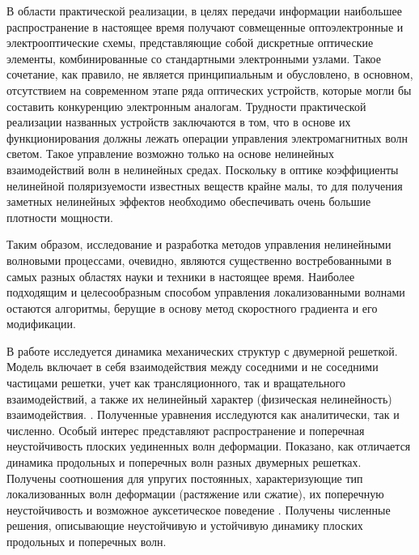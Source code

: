 В области практической реализации, в целях передачи информации наибольшее распространение в настоящее время получают совмещенные оптоэлектронные и электрооптические схемы, представляющие собой дискретные оптические элементы, комбинированные со стандартными электронными узлами. Такое сочетание, как правило, не является принципиальным и обусловлено, в основном, отсутствием на современном этапе ряда оптических устройств, которые могли бы составить конкуренцию электронным аналогам. Трудности практической реализации названных устройств заключаются в том, что в основе их функционирования должны лежать операции управления электромагнитных волн светом. Такое управление возможно только на основе нелинейных взаимодействий волн в нелинейных средах. Поскольку в оптике коэффициенты нелинейной поляризуемости известных веществ крайне малы, то для получения заметных нелинейных эффектов необходимо обеспечивать очень большие плотности мощности.

Таким образом, исследование и разработка методов управления нелинейными волновыми процессами, очевидно, являются существенно востребованными в самых разных областях науки и техники в настоящее время. Наиболее подходящим и целесообразным способом управления локализованными волнами остаются алгоритмы, берущие в основу метод скоростного градиента и его модификации. 



В работе исследуется динамика механических структур с двумерной решеткой. Модель включает в себя взаимодействия между соседними и не соседними частицами решетки, учет как трансляционного, так и вращательного взаимодействий, а также их нелинейный характер (физическая нелинейность) взаимодействия. . Полученные уравнения исследуются как аналитически, так и численно. Особый интерес представляют распространение и поперечная неустойчивость плоских уединенных волн деформации. Показано, как отличается динамика продольных и поперечных волн разных двумерных решетках. Получены соотношения для упругих постоянных, характеризующие тип локализованных волн деформации (растяжение или сжатие), их поперечную неустойчивость и возможное ауксетическое поведение . Получены численные решения, описывающие неустойчивую и устойчивую динамику плоских продольных и поперечных волн.

